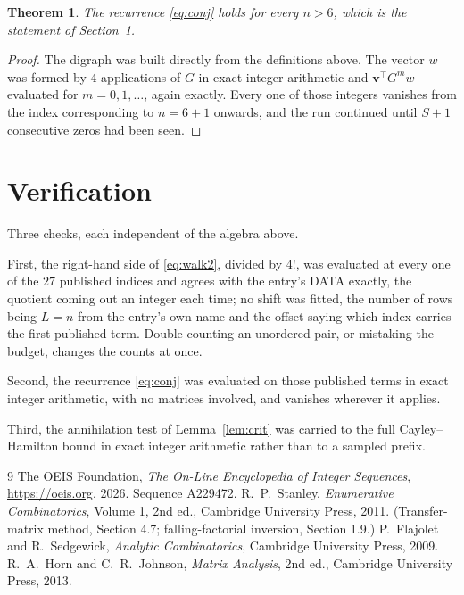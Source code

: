 \documentclass[11pt,a4paper]{article}
\theoremstyle{plain}
\newtheorem{theorem}{Theorem}
\theoremstyle{definition}
\begin{document}
\begin{theorem}
The recurrence \eqref{eq:conj} holds for every $n>6$, which is the statement of
Section~1.
\end{theorem}

\begin{proof}
The digraph was built directly from the definitions above. The vector $w$ was formed by
$4$ applications of $G$ in exact integer arithmetic and $\mathbf{v}^{\!\top}G^{m}w$
evaluated for $m=0,1,\dots$, again exactly. Every one of those integers vanishes from the
index corresponding to $n=6+1$ onwards, and the run continued until $S+1$ consecutive
zeros had been seen.
\end{proof}

\section{Verification}

Three checks, each independent of the algebra above.

First, the right-hand side of \eqref{eq:walk2}, divided by $4!$, was evaluated at every
one of the $27$ published indices and agrees with the entry's DATA exactly, the quotient
coming out an integer each time; no shift was fitted, the number of rows being $L=n$
from the entry's own name and the offset saying which index carries the first published term.
Double-counting an unordered pair, or mistaking the budget, changes the counts at once.

Second, the recurrence \eqref{eq:conj} was evaluated on those published terms in exact
integer arithmetic, with no matrices involved, and vanishes wherever it applies.

Third, the annihilation test of Lemma~\ref{lem:crit} was carried to the full
Cayley--Hamilton bound in exact integer arithmetic rather than to a sampled prefix.

\begin{thebibliography}{9}
 The OEIS Foundation, \emph{The On-Line Encyclopedia of Integer
Sequences}, \url{https://oeis.org}, 2026. Sequence A229472.
 R.~P.~Stanley, \emph{Enumerative Combinatorics}, Volume 1, 2nd ed.,
Cambridge University Press, 2011. (Transfer-matrix method, Section 4.7; falling-factorial
inversion, Section 1.9.)
 P.~Flajolet and R.~Sedgewick, \emph{Analytic Combinatorics}, Cambridge
University Press, 2009.
 R.~A.~Horn and C.~R.~Johnson, \emph{Matrix Analysis}, 2nd ed., Cambridge
University Press, 2013.
\end{thebibliography}
\end{document}
